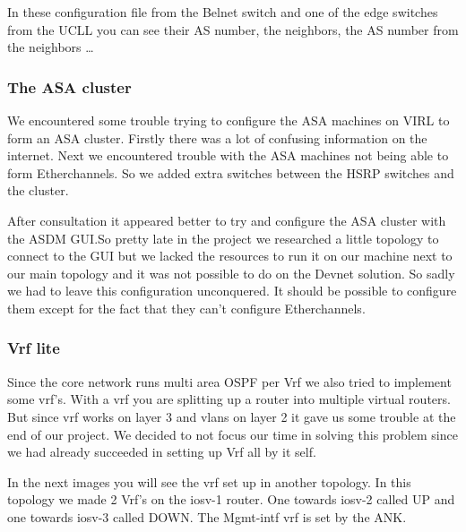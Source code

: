 \documentclass{article}
\begin{document}
In these configuration file from the Belnet switch and one of the edge switches from the UCLL you can see their AS number, the neighbors, the AS number from the neighbors \dots
\newpage
\subsubsection{The ASA cluster}

We encountered some trouble trying to configure the ASA machines on VIRL to form an ASA cluster. Firstly there was a lot of confusing information on the internet. Next we encountered trouble with the ASA machines not being able to form Etherchannels. So we added extra switches between the HSRP switches and the cluster.

After consultation it appeared better to try and configure the ASA cluster with the ASDM GUI.So pretty late in the project we researched a little topology to connect to the GUI but we lacked the resources to run it on our machine next to our main topology and it was not possible to do on the Devnet solution. So sadly we had to leave this configuration unconquered. It should be possible to configure them except for the fact that they can't configure Etherchannels.

\newpage
\subsubsection{Vrf lite}
Since the core network runs multi area OSPF per Vrf we also tried to implement some vrf's. With a vrf you are splitting up a router into multiple virtual routers. But since vrf works on layer 3 and vlans on layer 2 it gave us some trouble at the end of our project. We decided to not focus our time in solving this problem since we had already succeeded in setting up Vrf all by it self.

In the next images you will see the vrf set up in another topology. In this topology we made 2 Vrf's on the iosv-1 router. One towards iosv-2 called UP and one towards iosv-3 called DOWN. The Mgmt-intf vrf is set by the ANK.
\end{document}
